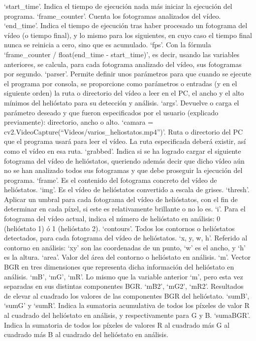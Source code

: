 \documentclass[12pt]{article}
\begin{document}
‘start\_time’. Indica el tiempo de ejecución nada más iniciar la ejecución del programa.
‘frame\_counter’. Cuenta los fotogramas analizados del vídeo.
‘end\_time’. Indica el tiempo de ejecución tras haber procesado un fotograma del vídeo (o tiempo final), y lo mismo para los siguientes, en cuyo caso el tiempo final nunca se reinicia a cero, sino que es acumulado.
‘fps’. Con la fórmula ‘frame\_counter / float(end\_time - start\_time)’, es decir, usando las variables anteriores, se calcula, para cada fotograma analizado del vídeo, sus fotogramas por segundo.
‘parser’. Permite definir unos parámetros para que cuando se ejecute el programa por consola, se proporcione como parámetros o entradas (y en el siguiente orden) la ruta o directorio del vídeo a leer en el PC, el ancho y el alto mínimos del helióstato para su detección y análisis.
‘args’. Devuelve o carga el parámetro deseado y que fueron especificados por el usuario (explicado previamente): directorio, ancho o alto.
‘camara = cv2.VideoCapture(“Videos/varios\_heliostatos.mp4”)’. Ruta o directorio del PC que el programa usará para leer el vídeo. La ruta especificada deberá existir, así como el vídeo en esa ruta.
‘grabbed’. Indica si se ha logrado cargar el siguiente fotograma del vídeo de helióstatos, queriendo además decir que dicho vídeo aún no se han analizado todos sus fotogramas y que debe proseguir la ejecución del programa.
‘frame’. Es el contenido del fotograma concreto del vídeo de helióstatos.
‘img’. Es el vídeo de helióstatos convertido a escala de grises.
‘thresh’. Aplicar un umbral para cada fotograma del vídeo de helióstatos, con el fin de determinar en cada píxel, si este es relativamente brillante o no lo es.
‘i’. Para el fotograma del vídeo actual, indica el número de helióstato en análisis: 0 (helióstato 1) ó 1 (helióstato 2).
‘contours’. Todos los contornos o helióstatos detectados, para cada fotograma del vídeo de helióstatos.
‘x, y, w, h’. Referido al contorno en análisis: ‘xy’ son las coordenadas de un punto, ‘w’ es el ancho, y ‘h’ es la altura.
‘area’. Valor del área del contorno o helióstato en análisis.
‘m’. Vector BGR en tres dimensiones que representa dicha información del helióstato en análisis.
‘mB’, ‘mG’, ‘mR’. Lo mismo que la variable anterior ‘m’, pero esta vez separadas en sus distintas componentes BGR.
‘mB2’, ‘mG2’, ‘mR2’. Resultados de elevar al cuadrado los valores de las componentes BGR del helióstato.
‘sumB’, ‘sumG’ y ‘sumR’. Indica la sumatoria acumulativa de todos los píxeles de valor R al cuadrado del helióstato en análisis, y respectivamente para G y B.
‘sumaBGR’. Indica la sumatoria de todos los píxeles de valores R al cuadrado más G al cuadrado más B al cuadrado del helióstato en análisis.
\end{document}
